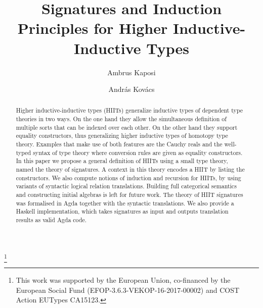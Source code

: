 \documentclass[dvipsnames]{lmcs} %
\newcommand{\1}{\mathsf{1}} \renewcommand{\Pr}{\mathsf{Pr}}
\theoremstyle{plain}\newtheorem{satz}[thm]{Satz} %
\begin{document}
\title{Signatures and Induction Principles for Higher Inductive-Inductive Types}

\author[A.~Kaposi]{Ambrus Kaposi}	%
\address{Department of Programming Languages and Compilers, E{\"o}tv{\"o}s Lor{\'a}nd University, Budapest, Hungary}	%

\author[A.~Kov{\'a}cs]{Andr{\'a}s Kov{\'a}cs}	%
\address{Department of Programming Languages and Compilers, E{\"o}tv{\"o}s Lor{\'a}nd University, Budapest, Hungary}	%
\thanks{This work was supported by the European Union, co-financed by the
European Social Fund (EFOP-3.6.3-VEKOP-16-2017-00002) and COST Action
EUTypes CA15123.}	%




\begin{abstract}
\noindent
Higher inductive-inductive types (HIITs) generalize inductive types of dependent
type theories in two ways. On the one hand they allow the simultaneous
definition of multiple sorts that can be indexed over each other. On the other
hand they support equality constructors, thus generalizing higher inductive
types of homotopy type theory. Examples that make use of both features are the
Cauchy reals and the well-typed syntax of type theory where conversion rules are
given as equality constructors. In this paper we propose a general definition of
HIITs using a small type theory, named the theory of signatures. A context in
this theory encodes a HIIT by listing the constructors. We also compute notions
of induction and recursion for HIITs, by using variants of syntactic logical
relation translations. Building full categorical semantics and constructing
initial algebras is left for future work. The theory of HIIT signatures was
formalised in Agda together with the syntactic translations. We also provide a
Haskell implementation, which takes signatures as input and outputs translation
results as valid Agda code.
\end{abstract}
\end{document}
